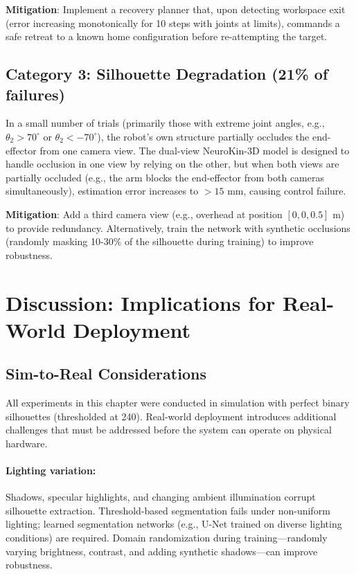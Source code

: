 \documentclass[12pt,a4paper,oneside]{report}
\begin{document}
\textbf{Mitigation}: Implement a recovery planner that, upon detecting workspace exit (error increasing monotonically for 10 steps with joints at limits), commands a safe retreat to a known home configuration before re-attempting the target.

\subsection{Category 3: Silhouette Degradation (21\% of failures)}

In a small number of trials (primarily those with extreme joint angles, e.g., $\theta_2 > 70^\circ$ or $\theta_2 < -70^\circ$), the robot's own structure partially occludes the end-effector from one camera view. The dual-view NeuroKin-3D model is designed to handle occlusion in one view by relying on the other, but when both views are partially occluded (e.g., the arm blocks the end-effector from both cameras simultaneously), estimation error increases to $>15$ mm, causing control failure.

\textbf{Mitigation}: Add a third camera view (e.g., overhead at position $[0, 0, 0.5]$ m) to provide redundancy. Alternatively, train the network with synthetic occlusions (randomly masking 10-30\% of the silhouette during training) to improve robustness.

\section{Discussion: Implications for Real-World Deployment}

\subsection{Sim-to-Real Considerations}

All experiments in this chapter were conducted in simulation with perfect binary silhouettes (thresholded at 240). Real-world deployment introduces additional challenges that must be addressed before the system can operate on physical hardware.

\paragraph{Lighting variation:} Shadows, specular highlights, and changing ambient illumination corrupt silhouette extraction. Threshold-based segmentation fails under non-uniform lighting; learned segmentation networks (e.g., U-Net trained on diverse lighting conditions) are required. Domain randomization during training---randomly varying brightness, contrast, and adding synthetic shadows---can improve robustness.
\end{document}
